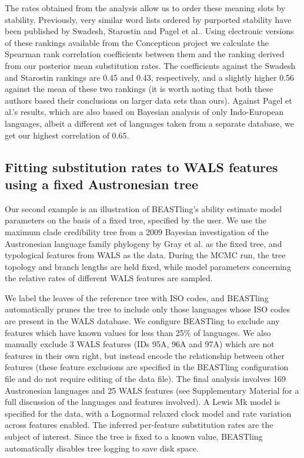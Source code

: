 \documentclass[10pt,a4paper]{article}
\begin{document}
The rates obtained from the analysis allow us to order these meaning slots by stability.  Previously, very similar word lists ordered by purported stability have been published by Swadesh\cite{Swadesh1955}, Starostin\cite{Starostin2007} and Pagel et al.\cite{Pagel2007}.  Using electronic versions of these rankings available from the Concepticon project\cite{List2015} we calculate the Spearman rank correlation coefficients between them and the ranking derived from our posterior mean substitution rates. The coefficients against the Swadesh and Starostin rankings are 0.45 and 0.43, respectively, and a slightly higher 0.56 against the mean of these two rankings (it is worth noting that both these authors based their conclusions on larger data sets than ours).  Against Pagel et al.'s results, which are also based on Bayesian analysis of only Indo-European languages, albeit a different set of languages taken from a separate database, we get our highest correlation of 0.65.

\subsection{Fitting substitution rates to WALS features using a fixed Austronesian tree}

Our second example is an illustration of BEASTling's ability estimate model parameters on the basis of a fixed tree, specified by the user.  We use the maximum clade credibility tree from a 2009 Bayesian investigation of the Austronesian language family phylogeny by Gray et al.\cite{Gray2009} as the fixed tree, and typological features from WALS \cite{Dryer2013} as the data.  During the MCMC run, the tree topology and branch lengths are held fixed, while model parameters concerning the relative rates of different WALS features are sampled.

We label the leaves of the reference tree with ISO codes, and BEASTling automatically prunes the tree to include only those languages whose ISO codes are present in the WALS database.  We configure BEASTling to exclude any features which have known values for less than 25\% of languages.  We also manually exclude 3 WALS features (IDs 95A, 96A and 97A) which are not features in their own right, but instead encode the relationship between other features (these feature exclusions are specified in the BEASTling configuration file and do not require editing of the data file).  The final analysis involves 169 Austronesian languages and 25 WALS features (see Supplementary Material for a full discussion of the languages and features involved).  A Lewis Mk model is specified for the data, with a Lognormal relaxed clock model and rate variation across features enabled.  The inferred per-feature substitution rates are the subject of interest.  Since the tree is fixed to a known value, BEASTling automatically disables tree logging to save disk space.
\end{document}
